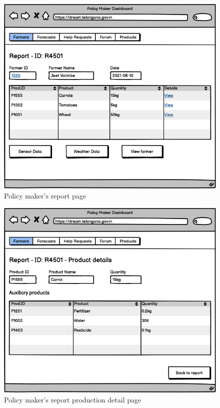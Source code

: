 \documentclass[10pt]{article} %
\begin{document}
\begin{figure}[h]
    \centering
    \includegraphics[scale=0.4]{images/uimockups/pm_reports.png}
    \caption{Policy maker's report page}
    \label{fig:ui_pm_reports}
\end{figure}
\begin{figure}[h]
    \centering
    \includegraphics[scale=0.4]{images/uimockups/pm_reportproductdetail.png}
    \caption{Policy maker's report production detail page}
    \label{fig:ui_pm_reportproductdetail}
\end{figure}
\end{document}
